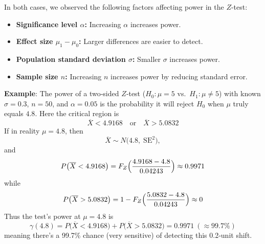 \documentclass[twoside]{book}
\begin{document}
\medskip
In both cases, we observed the following factors affecting power in the $Z$-test:
\begin{itemize}
  \item \textbf{Significance level \( \alpha \):} Increasing \( \alpha \) increases power.
  \item \textbf{Effect size \( \mu_1 - \mu_0 \):} Larger differences are easier to detect.
  \item \textbf{Population standard deviation \( \sigma \):} Smaller \( \sigma \) increases power.
  \item \textbf{Sample size \( n \):} Increasing \( n \) increases power by reducing standard error.
\end{itemize}

\textbf{Example}: The power of a two‐sided $Z$‐test ($H_0: \mu = 5$ vs.\ $H_1: \mu \neq 5$) with known $\sigma = 0.3$, $n = 50$, and $\alpha = 0.05$ is the probability it will reject $H_0$ when $\mu$ truly equals $4.8$.  Here the critical region is
\[
\overline{X} < 4.9168
\quad\text{or}\quad
\overline{X} > 5.0832
\]
If in reality $\mu = 4.8$, then
\[
\overline{X} \sim N\bigl(4.8,\;\mathrm{SE}^2\bigr),
\]
and
\[
P\bigl(\overline{X} < 4.9168\bigr)
= F_Z\Bigl(\frac{4.9168 - 4.8}{0.04243}\Bigr)
\approx 0.9971
\]
while
\[
P\bigl(\overline{X} > 5.0832\bigr)
= 1 - F_Z\Bigl(\frac{5.0832 - 4.8}{0.04243}\Bigr)
\approx 0
\]
Thus the test’s power at $\mu = 4.8$ is
$$\gamma(4.8) = P\bigl(\overline{X} < 4.9168\bigr)+P\bigl(\overline{X} > 5.0832\bigr) = 0.9971\ (\approx 99.7\%)$$
meaning there’s a 99.7\% chance (very sensitive) of detecting this 0.2‑unit shift.
\end{document}
